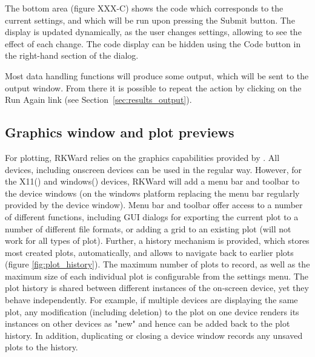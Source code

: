 The bottom area (figure XXX-C) shows the 
code which corresponds to the current settings, and which will be run
upon pressing the Submit button. The
display is updated dynamically, as the user changes settings, allowing
to see the effect of each change. The code display can be hidden using
the Code button in the right-hand section
of the dialog.

Most data handling functions will produce some output, which will be
sent to the output window. From there it is possible to repeat the
action by clicking on the Run Again link
(see Section~\ref{sec:results_output}).

\subsection{Graphics window and plot previews}
\label{sec:plot_previews}

For plotting, RKWard relies on the graphics capabilities provided by
. All 
devices, including onscreen devices can be used in the regular way.
However, for the X11() and windows() devices, RKWard will add a menu
bar and toolbar to the device windows (on the windows platform
replacing the menu bar regularly provided by the device window). Menu
bar and toolbar offer access to a number of different functions,
including GUI dialogs for exporting the current plot to a number of
different file formats, or adding a grid to an existing plot (will not
work for all types of plot). Further, a history mechanism is provided,
which stores most created plots, automatically, and allows to navigate
back to earlier plots (figure \ref{fig:plot_history}). The maximum number
of plots to record, as well as the maximum size of each individual plot
is configurable from the settings menu. The plot history is shared
between different instances of the on{}-screen device, yet they behave
independently. For example, if multiple devices are displaying the same
plot, any modification (including deletion) to the plot on one device
renders its instances on other devices as "new" and hence can be added
back to the plot history. In addition, duplicating or closing a device
window records any unsaved plots to the history.

